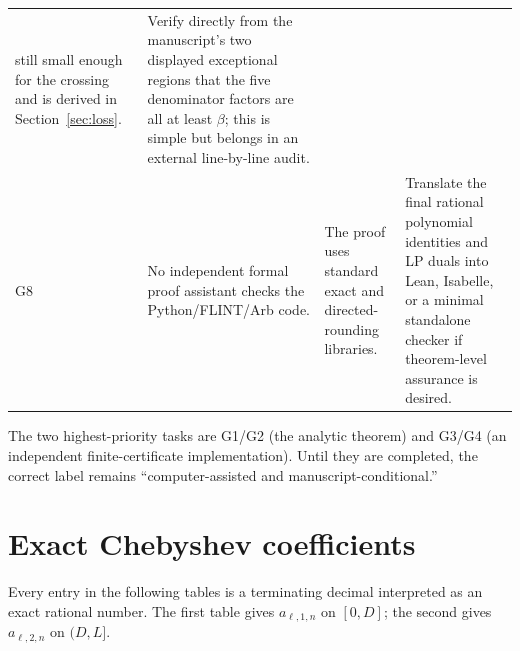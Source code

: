 \documentclass[11pt]{article}
\theoremstyle{definition}
\theoremstyle{remark}
\begin{document}
\begin{longtable}{p{}p{}p{}p{}}
still small enough for the crossing and is derived in Section~\ref{sec:loss}.&
Verify directly from the manuscript's two displayed exceptional regions that
the five denominator factors are all at least \(\beta\); this is simple but
belongs in an external line-by-line audit.\\
\addlinespace
G8&No independent formal proof assistant checks the Python/FLINT/Arb code.&The
proof uses standard exact and directed-rounding libraries.&Translate the final
rational polynomial identities and LP duals into Lean, Isabelle, or a minimal
standalone checker if theorem-level assurance is desired.\\
\bottomrule
\end{longtable}

The two highest-priority tasks are G1/G2 (the analytic theorem) and G3/G4 (an
independent finite-certificate implementation).  Until they are completed, the
correct label remains ``computer-assisted and manuscript-conditional.''

\appendix

\section{Exact Chebyshev coefficients}
\label{app:coefficients}

Every entry in the following tables is a terminating decimal interpreted as
an exact rational number.  The first table gives \(a_{\ell,1,n}\) on
\([0,D]\); the second gives \(a_{\ell,2,n}\) on \((D,L]\).

\begin{center}
\end{center}
\end{document}
